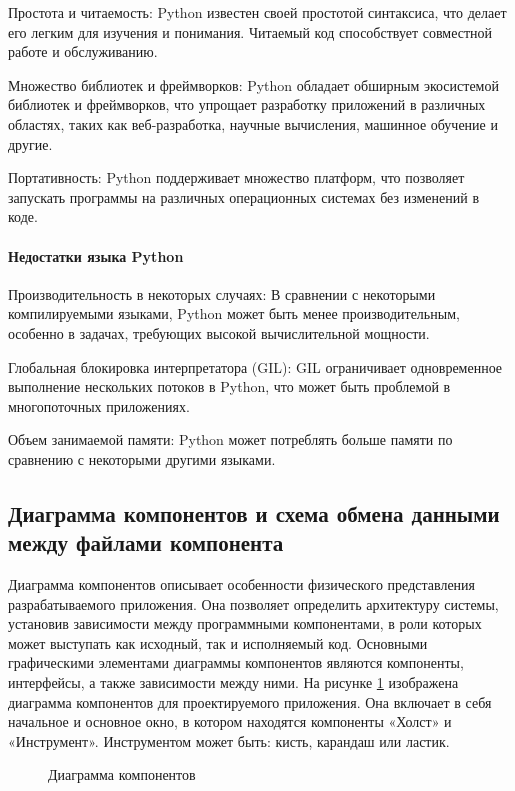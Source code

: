 Простота и читаемость: Python известен своей простотой синтаксиса, что делает его легким для изучения и понимания. Читаемый код способствует совместной работе и обслуживанию.

Множество библиотек и фреймворков: Python обладает обширным экосистемой библиотек и фреймворков, что упрощает разработку приложений в различных областях, таких как веб-разработка, научные вычисления, машинное обучение и другие.

Портативность: Python поддерживает множество платформ, что позволяет запускать программы на различных операционных системах без изменений в коде.

\paragraph{Недостатки языка Python}

Производительность в некоторых случаях: В сравнении с некоторыми компилируемыми языками, Python может быть менее производительным, особенно в задачах, требующих высокой вычислительной мощности.

Глобальная блокировка интерпретатора (GIL): GIL ограничивает одновременное выполнение нескольких потоков в Python, что может быть проблемой в многопоточных приложениях.

Объем занимаемой памяти: Python может потреблять больше памяти по сравнению с некоторыми другими языками.

\subsection{Диаграмма компонентов и схема обмена данными между файлами компонента}

Диаграмма компонентов описывает особенности физического представления разрабатываемого приложения. Она позволяет определить архитектуру системы, установив зависимости между программными компонентами, в роли которых может выступать как исходный, так и исполняемый код. Основными графическими элементами диаграммы компонентов являются компоненты, интерфейсы, а также зависимости между ними. На рисунке \ref{compo:image} изображена диаграмма компонентов для проектируемого приложения. Она включает в себя начальное и основное окно, в котором находятся компоненты «Холст» и «Инструмент». Инструментом может быть: кисть, карандаш или ластик.

\begin{figure}[ht]
\caption{Диаграмма компонентов}
\label{compo:image}
\end{figure}

